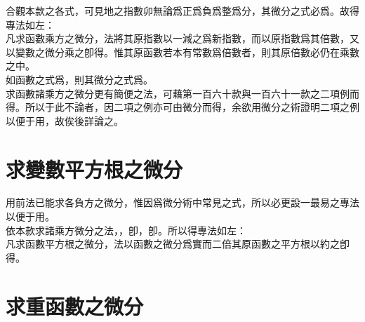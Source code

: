 \begin{enumerate} [label={第\chinese*款}]
	合觀本款之各式，可見地之指數卯無論爲正爲負爲整爲分，其微分之式必爲\CJKmove。故得專法如左：\\
	凡求函數乘方之微分，法將其原指數以一減之爲新指數，而以原指數爲其倍數，又以變數之微分乘之卽得。惟其原函數若本有常數爲倍數者，則其原倍數必仍在乘數之中。\\
	如函數之式爲\CJKmove，則其微分之式爲\CJKmove。\\
	求函數諸乘方之微分更有簡便之法，可藉第一百六十款與一百六十一款之二項例而得。所以于此不論者，因二項之例亦可由微分而得，余欲用微分之術證明二項之例以便于用，故俟後詳論之。
\end{enumerate}

\section{求變數平方根之微分}

\setlength{\leftskip}{25pt}

\noindent
用前法已能求各負方之微分，惟因\CJKmove 爲微分術中常見之式，所以必更設一最易之專法以便于用。\\
依本款求諸乘方微分之法，\CJKmove，卽\CJKmove，卽\CJKmove。所以得專法如左：\\
凡求函數平方根之微分，法以函數之微分爲實而二倍其原函數之平方根以約之卽得。

\setlength{\leftskip}{0pt}

\section{求重函數之微分}

